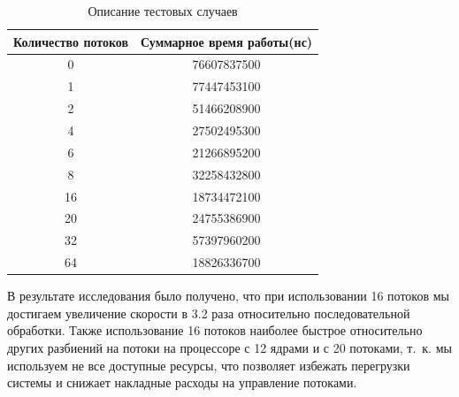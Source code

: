 \begin{table}[h]
    \begin{center}
        \begin{threeparttable}
    \caption{Описание тестовых случаев}
    \captionsetup{justification=raggedright, singlelinecheck=false}
    \label{tbl:mes}
    \begin{tabular}{|c|c|}
        \hline
        \textbf{Количество потоков} & \textbf{Суммарное время работы(нс)} \\
        \hline
        0 & 76607837500 \\
        \hline
        1 & 77447453100 \\
        \hline
        2 & 51466208900 \\
        \hline
        4 & 27502495300 \\
        \hline
        6 & 21266895200 \\
        \hline
        8 & 32258432800 \\
        \hline
        16 & 18734472100 \\
        \hline
        20 & 24755386900 \\
        \hline
        32 & 57397960200 \\
        \hline
        64 & 18826336700 \\
        \hline
    \end{tabular}
    \end{threeparttable}
    \end{center}
\end{table}

В результате исследования было получено, что при использовании 16 потоков мы достигаем увеличение скорости в 3.2 раза относительно последовательной обработки. Также использование 16 потоков наиболее быстрое относительно других разбиений на потоки на процессоре с 12 ядрами и с 20 потоками, т.~к. мы используем не все доступные ресурсы, что позволяет избежать перегрузки системы и снижает накладные расходы на управление потоками.

\clearpage